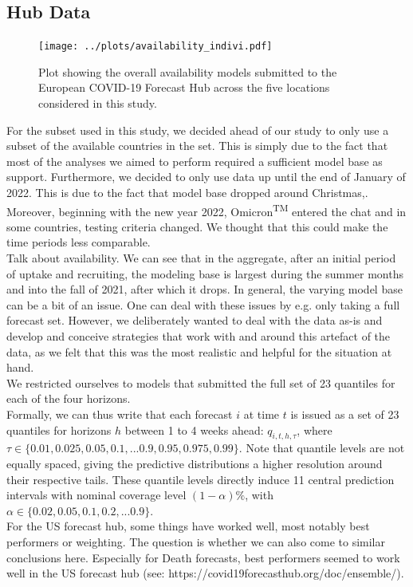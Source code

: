 \subsection{Hub Data}
\begin{figure}
\texttt{[image: ../plots/availability\_indivi.pdf]}
\caption{Plot showing the overall availability models submitted to the European COVID-19 Forecast Hub across the five locations considered in this study.}
\end{figure}
For the subset used in this study, we decided ahead of our study to only use a subset of the available countries in the set. This is simply due to the fact that most of the analyses we aimed to perform required a sufficient model base as support. Furthermore, we decided to only use data up until the end of January of 2022. This is due to the fact that model base dropped around Christmas,. Moreover, beginning with the new year 2022, Omicron\textsuperscript{TM} entered the chat and in some countries, testing criteria changed. We thought that this could make the time periods less comparable.\\
Talk about availability. We can see that in the aggregate, after an initial period of uptake and recruiting, the modeling base is largest during the summer months and into the fall of 2021, after which it drops.
In general, the varying model base can be a bit of an issue. One can deal with these issues by e.g. only taking a full forecast set. However, we deliberately wanted to deal with the data as-is and develop and conceive strategies that work with and around this artefact of the data, as we felt that this was the most realistic and helpful for the situation at hand. \\
We restricted ourselves to models that submitted the full set of 23 quantiles for each of the four horizons.\\
Formally, we can thus write that each forecast $i$ at time $t$ is issued as a set of 23 quantiles for horizons $h$ between 1 to 4 weeks ahead: $q_{i, t, h, \tau}$, where $\tau \in \{0.01, 0.025, 0.05, 0.1, ... 0.9, 0.95, 0.975, 0.99\} $. Note that quantile levels are not equally spaced, giving the predictive distributions a higher resolution around their respective tails. These quantile levels directly induce 11 central prediction intervals with nominal coverage level $(1-\alpha)\%$, with $\alpha \in \{0.02, 0.05, 0.1, 0.2, ... 0.9\}$.\\
For the US forecast hub, some things have worked well, most notably best performers or weighting. The question is whether we can also come to similar conclusions here. Especially for Death forecasts, best performers seemed to work well in the US forecast hub (see: https://covid19forecasthub.org/doc/ensemble/).
